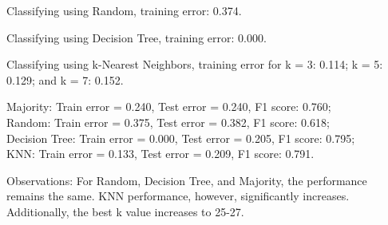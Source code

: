 \begin{enumerate}[resume]
Classifying using Random, training error: 0.374.

Classifying using Decision Tree, training error: 0.000.

Classifying using k-Nearest Neighbors, training error for k = 3: 0.114; k = 5: 0.129; and k = 7: 0.152.
 
Majority: Train error = 0.240, Test error = 0.240, F1 score: 0.760; \\
Random: Train error = 0.375, Test error = 0.382, F1 score: 0.618; \\
Decision Tree: Train error = 0.000, Test error = 0.205, F1 score: 0.795; \\
KNN: Train error = 0.133, Test error = 0.209, F1 score: 0.791.

Observations: For Random, Decision Tree, and Majority, the performance remains the same. KNN performance, however, significantly increases. Additionally, the best k value increases to 25-27.

\end{enumerate}


